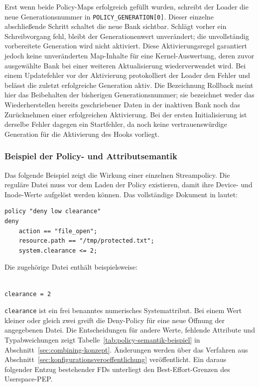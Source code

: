 Erst wenn beide Policy-Maps erfolgreich gefüllt wurden, schreibt der Loader die neue Generationsnummer in \texttt{POLICY\_GENERATION[0]}. Dieser einzelne abschließende Schritt schaltet die neue Bank sichtbar. Schlägt vorher ein Schreibvorgang fehl, bleibt der Generationenwert unverändert; die unvollständig vorbereitete Generation wird nicht aktiviert. Diese Aktivierungsregel garantiert jedoch keine unveränderten Map-Inhalte für eine Kernel-Auswertung, deren zuvor ausgewählte Bank bei einer weiteren Aktualisierung wiederverwendet wird. Bei einem Updatefehler vor der Aktivierung protokolliert der Loader den Fehler und belässt die zuletzt erfolgreiche Generation aktiv. Die Bezeichnung Rollback meint hier das Beibehalten der bisherigen Generationsnummer; sie bezeichnet weder das Wiederherstellen bereits geschriebener Daten in der inaktiven Bank noch das Zurücknehmen einer erfolgreichen Aktivierung. Bei der ersten Initialisierung ist derselbe Fehler dagegen ein Startfehler, da noch keine vertrauenswürdige Generation für die Aktivierung des Hooks vorliegt.

\subsubsection{Beispiel der Policy- und Attributsemantik}
Das folgende Beispiel zeigt die Wirkung einer einzelnen Streampolicy. Die reguläre Datei  muss vor dem Laden der Policy existieren, damit ihre Device- und Inode-Werte aufgelöst werden können. Das vollständige Dokument in  lautet:

\begin{verbatim}
policy "deny low clearance"
deny
    action == "file_open";
    resource.path == "/tmp/protected.txt";
    system.clearance <= 2;
\end{verbatim}

Die zugehörige Datei  enthält beispielsweise:

\begin{verbatim}

clearance = 2
\end{verbatim}

\texttt{clearance} ist ein frei benanntes numerisches Systemattribut. Bei einem Wert kleiner oder gleich zwei greift die Deny-Policy für eine neue Öffnung der angegebenen Datei. Die Entscheidungen für andere Werte, fehlende Attribute und Typabweichungen zeigt Tabelle~\ref{tab:policy-semantik-beispiel} in Abschnitt~\ref{sec:combining-konzept}. Änderungen werden über das Verfahren aus Abschnitt~\ref{sec:konfigurationsveroeffentlichung} veröffentlicht. Ein daraus folgender Entzug bestehender FDs unterliegt den Best-Effort-Grenzen des Userspace-PEP.

